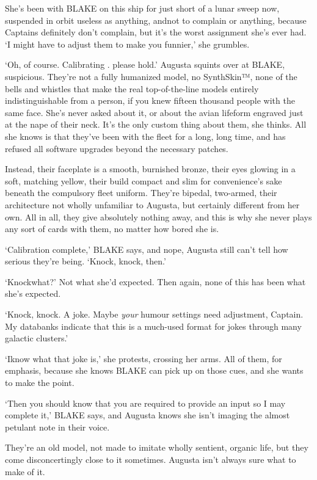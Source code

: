 She's been with BLAKE on this ship for just short of a lunar sweep
now, suspended in orbit useless as anything, and\textemdash not to
complain or anything, because Captains definitely don't complain, but
\textemdash{} it's the worst assignment she's ever had.  `I might have
to adjust them to make you funnier,' she grumbles.

`Oh, of course. Calibrating \textellipsis. please hold.' Augusta
squints over at BLAKE, suspicious. They're not a fully humanized
model, no SynthSkin™, none of the bells and whistles that make the
real top-of-the-line models entirely indistinguishable from a person,
if you knew fifteen thousand people with the same face. She's never
asked about it, or about the avian lifeform engraved just at the nape
of their neck. It's the only custom thing about them, she thinks. All
she knows is that they've been with the fleet for a long, long time,
and has refused all software upgrades beyond the necessary patches.

Instead, their faceplate is a smooth, burnished bronze, their eyes
glowing in a soft, matching yellow, their build compact and slim for
convenience's sake beneath the compulsory fleet uniform. They're
bipedal, two-armed, their architecture not wholly unfamiliar to
Augusta, but certainly different from her own. All in all, they give
absolutely nothing away, and this is why she never plays any sort of
cards with them, no matter how bored she is.

`Calibration complete,' BLAKE says, and nope, Augusta still can't tell
how serious they're being. `Knock, knock, then.'

`Knock\textemdash what?' Not what she'd expected. Then again, none
of this has been what she's expected.

`Knock, knock. A joke. Maybe \emph{your} humour settings need
adjustment, Captain. My databanks indicate that this is a much-used
format for jokes through many galactic clusters.'

`I\textemdash know what that joke is,' she protests, crossing her
arms. All of them, for emphasis, because she knows BLAKE can pick up
on those cues, and she wants to make the point.

`Then you should know that you are required to provide an input so I
may complete it,' BLAKE says, and Augusta knows she isn't imaging the
almost petulant note in their voice.

They're an old model, not made to imitate wholly sentient, organic
life, but they come disconcertingly close to it sometimes. Augusta
isn't always sure what to make of it.

